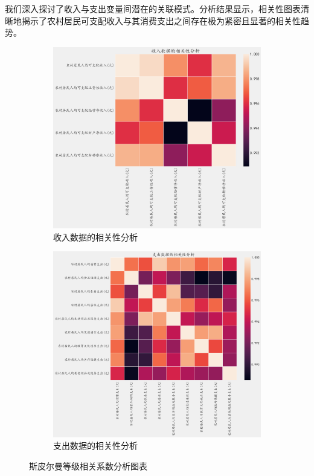 我们深入探讨了收入与支出变量间潜在的关联模式。分析结果显示，相关性图表清晰地揭示了农村居民可支配收入与其消费支出之间存在极为紧密且显著的相关性趋势。
\begin{figure}[H]
    \centering
    \begin{subfigure}{0.5\textwidth}
        \centering
        \includegraphics[width=\linewidth]{figures/income_corr.png}
        \caption{收入数据的相关性分析}
        \label{fig:income_corr}
    \end{subfigure}
    \begin{subfigure}{0.49\textwidth}
        \centering
        \includegraphics[width=\linewidth]{figures/expenditure_corr.png}
        \caption{支出数据的相关性分析}
        \label{fig:expenditure_corr}
    \end{subfigure}
    \caption{斯皮尔曼等级相关系数分析图表}
\end{figure}

